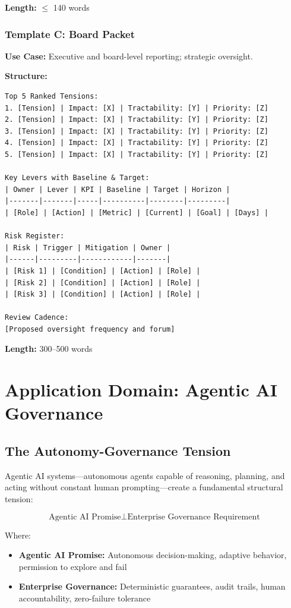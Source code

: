 \documentclass[11pt,a4paper]{article}
\begin{document}
\textbf{Length:} $\leq$ 140 words

\subsubsection{Template C: Board Packet}

\textbf{Use Case:} Executive and board-level reporting; strategic oversight.

\textbf{Structure:}
\begin{verbatim}
Top 5 Ranked Tensions:
1. [Tension] | Impact: [X] | Tractability: [Y] | Priority: [Z]
2. [Tension] | Impact: [X] | Tractability: [Y] | Priority: [Z]
3. [Tension] | Impact: [X] | Tractability: [Y] | Priority: [Z]
4. [Tension] | Impact: [X] | Tractability: [Y] | Priority: [Z]
5. [Tension] | Impact: [X] | Tractability: [Y] | Priority: [Z]

Key Levers with Baseline & Target:
| Owner | Lever | KPI | Baseline | Target | Horizon |
|-------|-------|-----|----------|--------|---------|
| [Role] | [Action] | [Metric] | [Current] | [Goal] | [Days] |

Risk Register:
| Risk | Trigger | Mitigation | Owner |
|------|---------|------------|-------|
| [Risk 1] | [Condition] | [Action] | [Role] |
| [Risk 2] | [Condition] | [Action] | [Role] |
| [Risk 3] | [Condition] | [Action] | [Role] |

Review Cadence:
[Proposed oversight frequency and forum]
\end{verbatim}

\textbf{Length:} 300--500 words

\section{Application Domain: Agentic AI Governance}

\subsection{The Autonomy-Governance Tension}

Agentic AI systems—autonomous agents capable of reasoning, planning, and acting without constant human prompting—create a fundamental structural tension:

\begin{equation}
\text{Agentic AI Promise} \perp \text{Enterprise Governance Requirement}
\end{equation}

Where:
\begin{itemize}
\item \textbf{Agentic AI Promise:} Autonomous decision-making, adaptive behavior, permission to explore and fail
\item \textbf{Enterprise Governance:} Deterministic guarantees, audit trails, human accountability, zero-failure tolerance
\end{itemize}
\end{document}

